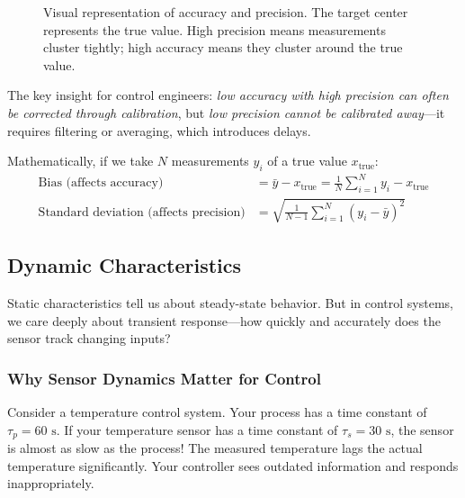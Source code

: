 \begin{figure}[htbp]
    \caption{Visual representation of accuracy and precision. The target center represents the true value. High precision means measurements cluster tightly; high accuracy means they cluster around the true value.}
    \label{fig:accuracy_precision}
\end{figure}

The key insight for control engineers: \textit{low accuracy with high precision can often be corrected through calibration}, but \textit{low precision cannot be calibrated away}---it requires filtering or averaging, which introduces delays.

Mathematically, if we take $N$ measurements $y_i$ of a true value $x_{\text{true}}$:
\begin{align}
\text{Bias (affects accuracy)} &= \bar{y} - x_{\text{true}} = \frac{1}{N}\sum_{i=1}^{N} y_i - x_{\text{true}} \label{eq:bias}\\
\text{Standard deviation (affects precision)} &= \sqrt{\frac{1}{N-1}\sum_{i=1}^{N}(y_i - \bar{y})^2} \label{eq:std_dev}
\end{align}

\subsection{Dynamic Characteristics}

Static characteristics tell us about steady-state behavior. But in control systems, we care deeply about transient response---how quickly and accurately does the sensor track changing inputs?

\subsubsection{Why Sensor Dynamics Matter for Control}

Consider a temperature control system. Your process has a time constant of $\tau_p = 60\text{ s}$. If your temperature sensor has a time constant of $\tau_s = 30\text{ s}$, the sensor is almost as slow as the process! The measured temperature lags the actual temperature significantly. Your controller sees outdated information and responds inappropriately.

